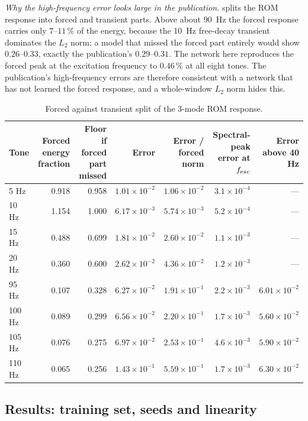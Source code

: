 \emph{Why the high-frequency error looks large in the publication.}  splits the ROM response into forced and transient parts. Above about 90~Hz the forced response carries only $7$--$11\,\%$ of the energy, because the 10~Hz free-decay transient dominates the $L_2$ norm; a model that missed the forced part entirely would show $0.26$--$0.33$, exactly the publication's $0.29$--$0.31$. The network here reproduces the forced peak at the excitation frequency to $0.46\,\%$ at all eight tones. The publication's high-frequency errors are therefore consistent with a network that has not learned the forced response, and a whole-window $L_2$ norm hides this.

\begin{table}[tbp]
\centering\footnotesize
\setlength{\tabcolsep}{3pt}
\caption{Forced against transient split of the 3-mode ROM response.}\label{tab:vf-fr-forced}
\begin{tabular}{@{}lrrrrrr@{}}
\toprule
Tone & Forced energy fraction & Floor if forced part missed & Error & Error / forced norm & Spectral-peak error at $f_{\rm exc}$ & Error above 40 Hz\\
\midrule
5 Hz & 0.918 & 0.958 & $1.01\times10^{-2}$ & $1.06\times10^{-2}$ & $3.1\times10^{-4}$ & ---\\
10 Hz & 1.154 & 1.000 & $6.17\times10^{-3}$ & $5.74\times10^{-3}$ & $5.2\times10^{-4}$ & ---\\
15 Hz & 0.488 & 0.699 & $1.81\times10^{-2}$ & $2.60\times10^{-2}$ & $1.1\times10^{-3}$ & ---\\
20 Hz & 0.360 & 0.600 & $2.62\times10^{-2}$ & $4.36\times10^{-2}$ & $1.2\times10^{-3}$ & ---\\
95 Hz & 0.107 & 0.328 & $6.27\times10^{-2}$ & $1.91\times10^{-1}$ & $2.2\times10^{-3}$ & $6.01\times10^{-2}$\\
100 Hz & 0.089 & 0.299 & $6.56\times10^{-2}$ & $2.20\times10^{-1}$ & $1.7\times10^{-3}$ & $5.60\times10^{-2}$\\
105 Hz & 0.076 & 0.275 & $6.97\times10^{-2}$ & $2.53\times10^{-1}$ & $4.6\times10^{-3}$ & $5.90\times10^{-2}$\\
110 Hz & 0.065 & 0.256 & $1.43\times10^{-1}$ & $5.59\times10^{-1}$ & $1.7\times10^{-3}$ & $6.30\times10^{-2}$\\
\bottomrule
\end{tabular}
\end{table}

\subsection*{Results: training set, seeds and linearity}


